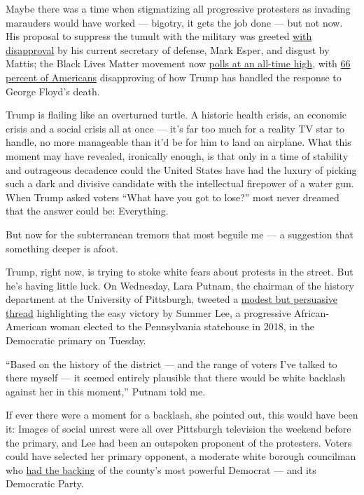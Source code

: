 Maybe there was a time when stigmatizing all progressive protesters as
invading marauders would have worked --- bigotry, it gets the job done
--- but not now. His proposal to suppress the tumult with the military
was greeted
\href{https://www.cnn.com/2020/06/03/politics/esper-insurrection-act-protests/index.html}{with
disapproval} by his current secretary of defense, Mark Esper, and
disgust by Mattis; the Black Lives Matter movement now
\href{https://twitter.com/drewlinzer/status/1268284131495964673?s=12}{polls
at an all-time high}, with
\href{https://www.ipsos.com/en-us/new-polls/abc-coronavirus-poll-wave-11}{66
percent of Americans} disapproving of how Trump has handled the response
to George Floyd's death.

Trump is flailing like an overturned turtle. A historic health crisis,
an economic crisis and a social crisis all at once --- it's far too much
for a reality TV star to handle, no more manageable than it'd be for him
to land an airplane. What this moment may have revealed, ironically
enough, is that only in a time of stability and outrageous decadence
could the United States have had the luxury of picking such a dark and
divisive candidate with the intellectual firepower of a water gun. When
Trump asked voters ``What have you got to lose?'' most never dreamed
that the answer could be: Everything.

But now for the subterranean tremors that most beguile me --- a
suggestion that something deeper is afoot.

Trump, right now, is trying to stoke white fears about protests in the
street. But he's having little luck. On Wednesday, Lara Putnam, the
chairman of the history department at the University of Pittsburgh,
tweeted a
\href{https://twitter.com/lara_putnam/status/1268164268161216514}{modest
but persuasive thread} highlighting the easy victory by Summer Lee, a
progressive African-American woman elected to the Pennsylvania
statehouse in 2018, in the Democratic primary on Tuesday.

``Based on the history of the district --- and the range of voters I've
talked to there myself --- it seemed entirely plausible that there would
be white backlash against her in this moment,'' Putnam told me.

If ever there were a moment for a backlash, she pointed out, this would
have been it: Images of social unrest were all over Pittsburgh
television the weekend before the primary, and Lee had been an outspoken
proponent of the protesters. Voters could have selected her primary
opponent, a moderate white borough councilman who
\href{https://www.penncapital-star.com/government-politics/allegheny-county-democratic-committee-endorses-trump-supporter-fails-to-back-african-american-incumbent/}{had
the backing} of the county's most powerful Democrat --- and its
Democratic Party.

